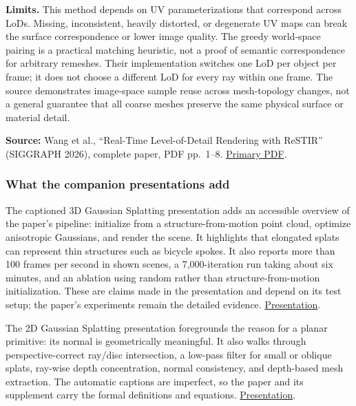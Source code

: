 \textbf{Limits.} This method depends on UV parameterizations that correspond across LoDs. Missing, inconsistent, heavily distorted, or degenerate UV maps can break the surface correspondence or lower image quality. The greedy world-space pairing is a practical matching heuristic, not a proof of semantic correspondence for arbitrary remeshes. Their implementation switches one LoD per object per frame; it does not choose a different LoD for every ray within one frame. The source demonstrates image-space sample reuse across mesh-topology changes, not a general guarantee that all coarse meshes preserve the same physical surface or material detail.

\textbf{Source:} Wang et al., ``Real-Time Level-of-Detail Rendering with ReSTIR'' (SIGGRAPH 2026), complete paper, PDF pp.~1--8. \href{https://research.nvidia.com/labs/rtr/publication/wang2026levelOfDetail/wang2026levelOfDetail.pdf}{Primary PDF}.

\subsubsection{What the companion presentations add}\label{03-visual-computing-i-ch012-what-the-companion-presentations-add}

\hypertarget{03-visual-computing-i-ch012-what-the-companion-presentations-add}{}

The captioned 3D Gaussian Splatting presentation adds an accessible overview of the paper's pipeline: initialize from a structure-from-motion point cloud, optimize anisotropic Gaussians, and render the scene. It highlights that elongated splats can represent thin structures such as bicycle spokes. It also reports more than 100 frames per second in shown scenes, a 7,000-iteration run taking about six minutes, and an ablation using random rather than structure-from-motion initialization. These are claims made in the presentation and depend on its test setup; the paper's experiments remain the detailed evidence. \href{https://www.youtube.com/watch?v=T_kXY43VZnk}{Presentation}.

The 2D Gaussian Splatting presentation foregrounds the reason for a planar primitive: its normal is geometrically meaningful. It also walks through perspective-correct ray/disc intersection, a low-pass filter for small or oblique splats, ray-wise depth concentration, normal consistency, and depth-based mesh extraction. The automatic captions are imperfect, so the paper and its supplement carry the formal definitions and equations. \href{https://www.youtube.com/watch?v=oaHCtB6yiKU}{Presentation}.

